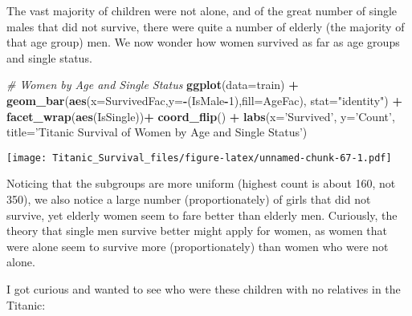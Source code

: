 \documentclass[]{article}
\newenvironment{Shaded}{\begin{snugshade}}{\end{snugshade}}
\newcommand{\KeywordTok}[1]{\textcolor[rgb]{0.13,0.29,0.53}{\textbf{#1}}}
\newcommand{\DataTypeTok}[1]{\textcolor[rgb]{0.13,0.29,0.53}{#1}}
\newcommand{\DecValTok}[1]{\textcolor[rgb]{0.00,0.00,0.81}{#1}}
\newcommand{\StringTok}[1]{\textcolor[rgb]{0.31,0.60,0.02}{#1}}
\newcommand{\CommentTok}[1]{\textcolor[rgb]{0.56,0.35,0.01}{\textit{#1}}}
\newcommand{\OperatorTok}[1]{\textcolor[rgb]{0.81,0.36,0.00}{\textbf{#1}}}
\newcommand{\NormalTok}[1]{#1}
\begin{document}
The vast majority of children were not alone, and of the great number of
single males that did not survive, there were quite a number of elderly
(the majority of that age group) men. We now wonder how women survived
as far as age groups and single status.

\begin{Shaded}
\begin{Highlighting}[]
\CommentTok{# Women by Age and Single Status}
\KeywordTok{ggplot}\NormalTok{(}\DataTypeTok{data=}\NormalTok{train) }\OperatorTok{+}
\StringTok{   }\KeywordTok{geom_bar}\NormalTok{(}\KeywordTok{aes}\NormalTok{(}\DataTypeTok{x=}\NormalTok{SurvivedFac,}\DataTypeTok{y=}\OperatorTok{-}\NormalTok{(IsMale}\OperatorTok{-}\DecValTok{1}\NormalTok{),}\DataTypeTok{fill=}\NormalTok{AgeFac), }\DataTypeTok{stat=}\StringTok{"identity"}\NormalTok{) }\OperatorTok{+}
\StringTok{   }\KeywordTok{facet_wrap}\NormalTok{(}\KeywordTok{aes}\NormalTok{(IsSingle))}\OperatorTok{+}
\StringTok{           }\KeywordTok{coord_flip}\NormalTok{() }\OperatorTok{+}
\StringTok{   }\KeywordTok{labs}\NormalTok{(}\DataTypeTok{x=}\StringTok{'Survived'}\NormalTok{, }\DataTypeTok{y=}\StringTok{'Count'}\NormalTok{, }
   \DataTypeTok{title=}\StringTok{'Titanic Survival of Women by Age and Single Status'}\NormalTok{)}
\end{Highlighting}
\end{Shaded}

\texttt{[image: Titanic\_Survival\_files/figure-latex/unnamed-chunk-67-1.pdf]}

Noticing that the subgroups are more uniform (highest count is about
160, not 350), we also notice a large number (proportionately) of girls
that did not survive, yet elderly women seem to fare better than elderly
men. Curiously, the theory that single men survive better might apply
for women, as women that were alone seem to survive more
(proportionately) than women who were not alone.

I got curious and wanted to see who were these children with no
relatives in the Titanic:

\begin{Shaded}
\end{Shaded}
\end{document}
